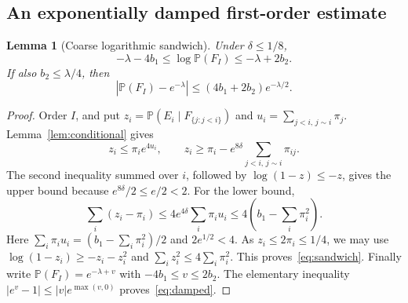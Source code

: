 \documentclass[11pt]{article}
\newtheorem{lemma}[theorem]{Lemma}
\theoremstyle{definition}\newtheorem{definition}[theorem]{Definition}
\theoremstyle{remark}\newtheorem{remark}[theorem]{Remark}
\newcommand{\PP}{\mathbb P}
\newcommand{\la}{\lambda}
\begin{document}
\subsection{An exponentially damped first-order estimate}
\begin{lemma}[Coarse logarithmic sandwich]\label{lem:sandwich}
Under $\delta\le1/8$,
\begin{equation}
 -\la-4b_1\le\log\PP(F_I)\le-\la+2b_2.
 \label{eq:sandwich}
\end{equation}
If also $b_2\le\la/4$, then
\begin{equation}
 |\PP(F_I)-e^{-\la}|\le(4b_1+2b_2)e^{-\la/2}.
 \label{eq:damped}
\end{equation}
\end{lemma}
\begin{proof}
Order $I$, and put $z_i=\PP(E_i\mid F_{\{j:j<i\}})$ and
$u_i=\sum_{j<i,\,j\sim i}\pi_j$.
Lemma~\ref{lem:conditional} gives
\[
 z_i\le\pi_i e^{4u_i},\qquad
 z_i\ge\pi_i-e^{8\delta}\sum_{j<i,\,j\sim i}\pi_{ij}.
\]
The second inequality summed over $i$, followed by
$\log(1-z)\le-z$, gives the upper bound because
$e^{8\delta}/2\le e/2<2$.
For the lower bound,
\[
 \sum_i(z_i-\pi_i)
 \le4e^{4\delta}\sum_i\pi_i u_i
 \le4\left(b_1-\sum_i\pi_i^2\right).
\]
Here $\sum_i\pi_i u_i=(b_1-\sum_i\pi_i^2)/2$ and
$2e^{1/2}<4$. As $z_i\le2\pi_i\le1/4$, we may use
$\log(1-z_i)\ge-z_i-z_i^2$ and
$\sum_i z_i^2\le4\sum_i\pi_i^2$. This proves~\eqref{eq:sandwich}.
Finally write $\PP(F_I)=e^{-\la+v}$ with
$-4b_1\le v\le2b_2$. The elementary inequality
$|e^v-1|\le|v|e^{\max(v,0)}$ proves~\eqref{eq:damped}.
\end{proof}
\end{document}
